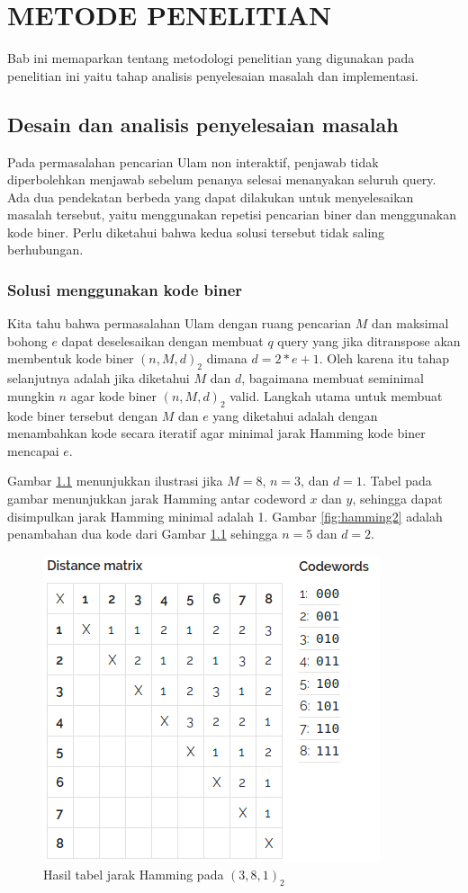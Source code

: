 \chapter{METODE PENELITIAN}

Bab ini memaparkan tentang metodologi penelitian yang digunakan pada penelitian ini yaitu tahap analisis penyelesaian masalah dan implementasi.


\section{Desain dan analisis penyelesaian masalah}

Pada permasalahan pencarian Ulam non interaktif, penjawab tidak diperbolehkan menjawab sebelum penanya selesai menanyakan seluruh query. Ada dua pendekatan berbeda yang dapat dilakukan untuk menyelesaikan masalah tersebut, yaitu menggunakan repetisi pencarian biner dan menggunakan kode biner. Perlu diketahui bahwa kedua solusi tersebut tidak saling berhubungan.


\subsection{Solusi menggunakan kode biner}

Kita tahu bahwa permasalahan Ulam dengan ruang pencarian $M$ dan maksimal bohong $e$ dapat deselesaikan dengan membuat $q$ query yang jika ditranspose akan membentuk kode biner $(n,M,d)_2$ dimana $d = 2*e+1$. Oleh karena itu tahap selanjutnya adalah jika diketahui $M$ dan $d$, bagaimana membuat seminimal mungkin $n$ agar kode biner $(n,M,d)_2$ valid. Langkah utama untuk membuat kode biner tersebut dengan $M$ dan $e$ yang diketahui adalah dengan menambahkan kode secara iteratif agar minimal jarak Hamming kode biner mencapai $e$.

Gambar \ref{fig:hamming1} menunjukkan ilustrasi jika $M = 8$, $n = 3$, dan $d = 1$. Tabel pada gambar  menunjukkan jarak Hamming antar codeword $x$ dan $y$, sehingga dapat disimpulkan jarak Hamming minimal adalah 1. Gambar \ref{fig:hamming2} adalah penambahan dua kode dari Gambar \ref{fig:hamming1} sehingga $n = 5$ dan $d = 2$.

\begin{figure}
\centering
\includegraphics[scale=0.7]{../img/hamming1.png}
\caption{Hasil tabel jarak Hamming pada $(3,8,1)_2$}
\label{fig:hamming1}
\end{figure}

